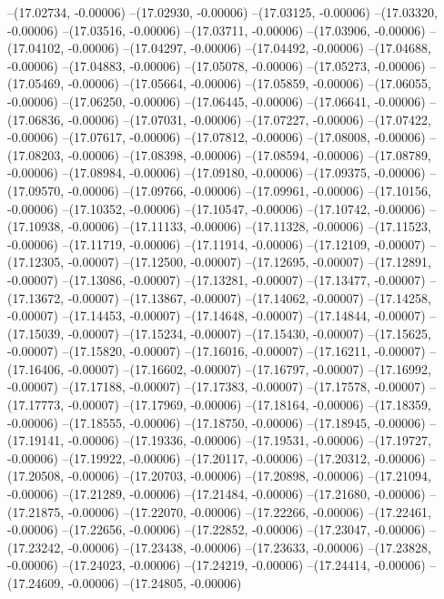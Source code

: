 --(17.02734, -0.00006)
--(17.02930, -0.00006)
--(17.03125, -0.00006)
--(17.03320, -0.00006)
--(17.03516, -0.00006)
--(17.03711, -0.00006)
--(17.03906, -0.00006)
--(17.04102, -0.00006)
--(17.04297, -0.00006)
--(17.04492, -0.00006)
--(17.04688, -0.00006)
--(17.04883, -0.00006)
--(17.05078, -0.00006)
--(17.05273, -0.00006)
--(17.05469, -0.00006)
--(17.05664, -0.00006)
--(17.05859, -0.00006)
--(17.06055, -0.00006)
--(17.06250, -0.00006)
--(17.06445, -0.00006)
--(17.06641, -0.00006)
--(17.06836, -0.00006)
--(17.07031, -0.00006)
--(17.07227, -0.00006)
--(17.07422, -0.00006)
--(17.07617, -0.00006)
--(17.07812, -0.00006)
--(17.08008, -0.00006)
--(17.08203, -0.00006)
--(17.08398, -0.00006)
--(17.08594, -0.00006)
--(17.08789, -0.00006)
--(17.08984, -0.00006)
--(17.09180, -0.00006)
--(17.09375, -0.00006)
--(17.09570, -0.00006)
--(17.09766, -0.00006)
--(17.09961, -0.00006)
--(17.10156, -0.00006)
--(17.10352, -0.00006)
--(17.10547, -0.00006)
--(17.10742, -0.00006)
--(17.10938, -0.00006)
--(17.11133, -0.00006)
--(17.11328, -0.00006)
--(17.11523, -0.00006)
--(17.11719, -0.00006)
--(17.11914, -0.00006)
--(17.12109, -0.00007)
--(17.12305, -0.00007)
--(17.12500, -0.00007)
--(17.12695, -0.00007)
--(17.12891, -0.00007)
--(17.13086, -0.00007)
--(17.13281, -0.00007)
--(17.13477, -0.00007)
--(17.13672, -0.00007)
--(17.13867, -0.00007)
--(17.14062, -0.00007)
--(17.14258, -0.00007)
--(17.14453, -0.00007)
--(17.14648, -0.00007)
--(17.14844, -0.00007)
--(17.15039, -0.00007)
--(17.15234, -0.00007)
--(17.15430, -0.00007)
--(17.15625, -0.00007)
--(17.15820, -0.00007)
--(17.16016, -0.00007)
--(17.16211, -0.00007)
--(17.16406, -0.00007)
--(17.16602, -0.00007)
--(17.16797, -0.00007)
--(17.16992, -0.00007)
--(17.17188, -0.00007)
--(17.17383, -0.00007)
--(17.17578, -0.00007)
--(17.17773, -0.00007)
--(17.17969, -0.00006)
--(17.18164, -0.00006)
--(17.18359, -0.00006)
--(17.18555, -0.00006)
--(17.18750, -0.00006)
--(17.18945, -0.00006)
--(17.19141, -0.00006)
--(17.19336, -0.00006)
--(17.19531, -0.00006)
--(17.19727, -0.00006)
--(17.19922, -0.00006)
--(17.20117, -0.00006)
--(17.20312, -0.00006)
--(17.20508, -0.00006)
--(17.20703, -0.00006)
--(17.20898, -0.00006)
--(17.21094, -0.00006)
--(17.21289, -0.00006)
--(17.21484, -0.00006)
--(17.21680, -0.00006)
--(17.21875, -0.00006)
--(17.22070, -0.00006)
--(17.22266, -0.00006)
--(17.22461, -0.00006)
--(17.22656, -0.00006)
--(17.22852, -0.00006)
--(17.23047, -0.00006)
--(17.23242, -0.00006)
--(17.23438, -0.00006)
--(17.23633, -0.00006)
--(17.23828, -0.00006)
--(17.24023, -0.00006)
--(17.24219, -0.00006)
--(17.24414, -0.00006)
--(17.24609, -0.00006)
--(17.24805, -0.00006)
